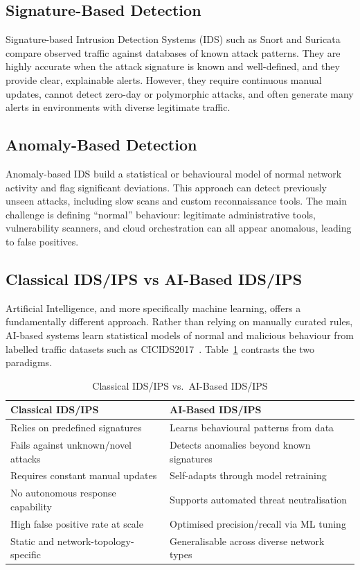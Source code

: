\documentclass[12pt,a4paper]{report}
\begin{document}
\subsection{Signature-Based Detection}

Signature-based Intrusion Detection Systems (IDS) such as Snort and Suricata compare observed traffic against databases of known attack patterns. They are highly accurate when the attack signature is known and well-defined, and they provide clear, explainable alerts. However, they require continuous manual updates, cannot detect zero-day or polymorphic attacks, and often generate many alerts in environments with diverse legitimate traffic.

\subsection{Anomaly-Based Detection}

Anomaly-based IDS build a statistical or behavioural model of normal network activity and flag significant deviations. This approach can detect previously unseen attacks, including slow scans and custom reconnaissance tools. The main challenge is defining ``normal'' behaviour: legitimate administrative tools, vulnerability scanners, and cloud orchestration can all appear anomalous, leading to false positives.

\subsection{Classical IDS/IPS vs AI-Based IDS/IPS}

Artificial Intelligence, and more specifically machine learning, offers a fundamentally different approach. Rather than relying on manually curated rules, AI-based systems learn statistical models of normal and malicious behaviour from labelled traffic datasets such as CICIDS2017~\cite{cicids2017}. Table~\ref{tab:ids-comparison} contrasts the two paradigms.

\begin{table}[H]
\centering
\caption{Classical IDS/IPS vs.\ AI-Based IDS/IPS}
\label{tab:ids-comparison}
\begin{tabularx}{\textwidth}{XX}
\toprule
\textbf{Classical IDS/IPS} & \textbf{AI-Based IDS/IPS} \\
\midrule
Relies on predefined signatures & Learns behavioural patterns from data \\
Fails against unknown/novel attacks & Detects anomalies beyond known signatures \\
Requires constant manual updates & Self-adapts through model retraining \\
No autonomous response capability & Supports automated threat neutralisation \\
High false positive rate at scale & Optimised precision/recall via ML tuning \\
Static and network-topology-specific & Generalisable across diverse network types \\
\bottomrule
\end{tabularx}
\end{table}
\end{document}
